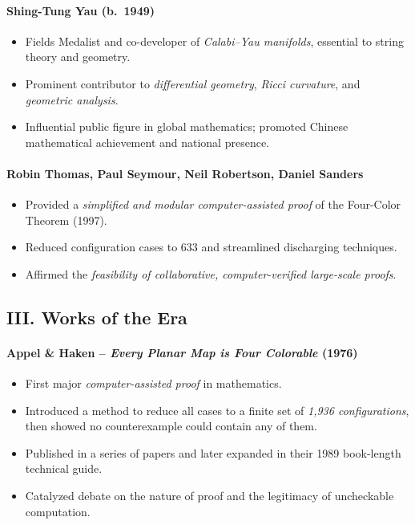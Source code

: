 \documentclass[9pt]{article}
\begin{document}
\paragraph{Shing-Tung Yau (b.\ 1949)}
\begin{itemize}
  \item Fields Medalist and co-developer of \textit{Calabi--Yau manifolds}, essential to string theory and geometry.
  \item Prominent contributor to \textit{differential geometry}, \textit{Ricci curvature}, and \textit{geometric analysis}.
  \item Influential public figure in global mathematics; promoted Chinese mathematical achievement and national presence.
\end{itemize}

\paragraph{Robin Thomas, Paul Seymour, Neil Robertson, Daniel Sanders}
\begin{itemize}
  \item Provided a \textit{simplified and modular computer-assisted proof} of the Four-Color Theorem (1997).
  \item Reduced configuration cases to 633 and streamlined discharging techniques.
  \item Affirmed the \textit{feasibility of collaborative, computer-verified large-scale proofs}.
\end{itemize}

\newpage

\subsection*{III. Works of the Era}

\paragraph{Appel \& Haken – \textit{Every Planar Map is Four Colorable} (1976)}
\begin{itemize}
  \item First major \textit{computer-assisted proof} in mathematics.
  \item Introduced a method to reduce all cases to a finite set of \textit{1,936 configurations}, then showed no counterexample could contain any of them.
  \item Published in a series of papers and later expanded in their 1989 book-length technical guide.
  \item Catalyzed debate on the nature of proof and the legitimacy of uncheckable computation.
\end{itemize}
\end{document}
